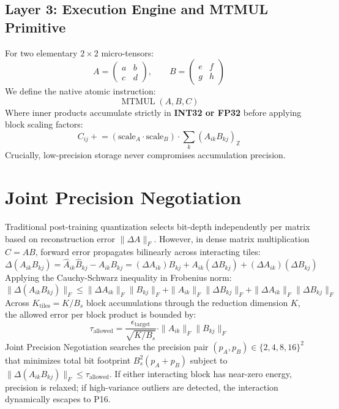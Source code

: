 \documentclass[11pt,a4paper]{article}
\begin{document}
\subsection{Layer 3: Execution Engine and MTMUL Primitive}
For two elementary $2\times 2$ micro-tensors:
\begin{equation}
A = \begin{pmatrix} a & b \\ c & d \end{pmatrix}, \qquad B = \begin{pmatrix} e & f \\ g & h \end{pmatrix}
\end{equation}
We define the native atomic instruction:
\begin{equation}
\operatorname{MTMUL}(A, B, C)
\end{equation}
Where inner products accumulate strictly in \textbf{INT32 or FP32} before applying block scaling factors:
\begin{equation}
C_{ij} \mathrel{+}= (\text{scale}_A \cdot \text{scale}_B) \cdot \sum_k (A_{ik} B_{kj})_{\mathbb{Z}}
\end{equation}
Crucially, low-precision storage never compromises accumulation precision.

\section{Joint Precision Negotiation}

Traditional post-training quantization selects bit-depth independently per matrix based on reconstruction error $\|\Delta A\|_F$. However, in dense matrix multiplication $C = A B$, forward error propagates bilinearly across interacting tiles:
\begin{equation}
\Delta (A_{ik} B_{kj}) = \hat{A}_{ik}\hat{B}_{kj} - A_{ik} B_{kj} = (\Delta A_{ik}) B_{kj} + A_{ik} (\Delta B_{kj}) + (\Delta A_{ik})(\Delta B_{kj})
\end{equation}
Applying the Cauchy-Schwarz inequality in Frobenius norm:
\begin{equation}
\|\Delta (A_{ik} B_{kj})\|_F \le \|\Delta A_{ik}\|_F \|B_{kj}\|_F + \|A_{ik}\|_F \|\Delta B_{kj}\|_F + \|\Delta A_{ik}\|_F \|\Delta B_{kj}\|_F
\end{equation}
Across $K_{\text{tiles}} = K / B_s$ block accumulations through the reduction dimension $K$, the allowed error per block product is bounded by:
\begin{equation}
\tau_{\text{allowed}} = \frac{\epsilon_{\text{target}}}{\sqrt{K / B_s}} \cdot \|A_{ik}\|_F \|B_{kj}\|_F
\end{equation}
Joint Precision Negotiation searches the precision pair $(p_A, p_B) \in \{2, 4, 8, 16\}^2$ that minimizes total bit footprint $B_s^2 (p_A + p_B)$ subject to $\|\Delta(A_{ik} B_{kj})\|_F \le \tau_{\text{allowed}}$. If either interacting block has near-zero energy, precision is relaxed; if high-variance outliers are detected, the interaction dynamically escapes to P16.
\end{document}
